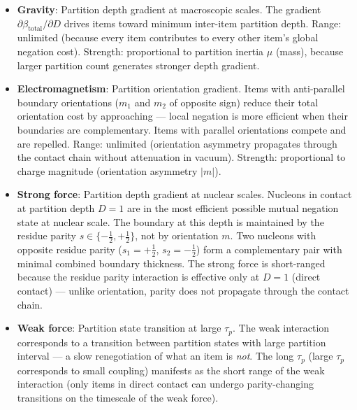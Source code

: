 \begin{itemize}
    \item \textbf{Gravity}: Partition depth gradient at macroscopic scales.
          The gradient $\partial\beta_{\mathrm{total}}/\partial D$ drives items
          toward minimum inter-item partition depth. Range: unlimited (because
          every item contributes to every other item's global negation cost).
          Strength: proportional to partition inertia $\mu$ (mass), because
          larger partition count generates stronger depth gradient.

    \item \textbf{Electromagnetism}: Partition orientation gradient. Items with
          anti-parallel boundary orientations ($m_1$ and $m_2$ of opposite sign)
          reduce their total orientation cost by approaching --- local negation is
          more efficient when their boundaries are complementary. Items with
          parallel orientations compete and are repelled. Range: unlimited
          (orientation asymmetry propagates through the contact chain without
          attenuation in vacuum). Strength: proportional to charge magnitude
          (orientation asymmetry $|m|$).

    \item \textbf{Strong force}: Partition depth gradient at nuclear scales.
          Nucleons in contact at partition depth $D = 1$ are in the most
          efficient possible mutual negation state at nuclear scale. The boundary
          at this depth is maintained by the residue parity $s \in
          \{-\frac{1}{2}, +\frac{1}{2}\}$, not by orientation $m$. Two nucleons
          with opposite residue parity ($s_1 = +\frac{1}{2}$, $s_2 =
          -\frac{1}{2}$) form a complementary pair with minimal combined
          boundary thickness. The strong force is short-ranged because the
          residue parity interaction is effective only at $D = 1$ (direct
          contact) --- unlike orientation, parity does not propagate through
          the contact chain.

    \item \textbf{Weak force}: Partition state transition at large $\tau_p$.
          The weak interaction corresponds to a transition between partition
          states with large partition interval --- a slow renegotiation of what
          an item is \emph{not}. The long $\tau_p$ (large $\tau_p$ corresponds
          to small coupling) manifests as the short range of the weak interaction
          (only items in direct contact can undergo parity-changing transitions
          on the timescale of the weak force).
\end{itemize}

